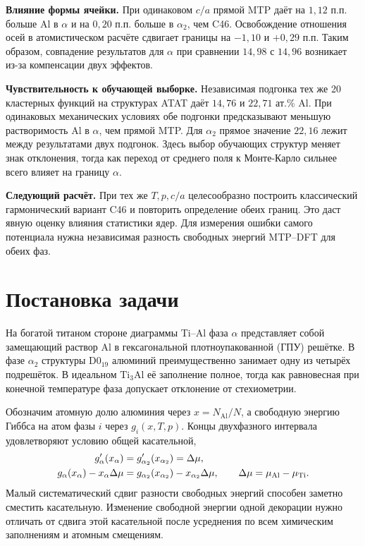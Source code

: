 \documentclass[11pt,a4paper]{article}
\begin{document}
\noindent\textbf{Влияние формы ячейки.}
При одинаковом \(c/a\) прямой MTP даёт на \(1{,}12\) п.п. больше Al
в \(\alpha\) и на \(0{,}20\) п.п. больше в \(\alpha_2\), чем C46.
Освобождение отношения осей в атомистическом расчёте сдвигает границы
на \(-1{,}10\) и \(+0{,}29\) п.п. Таким образом, совпадение результатов
для \(\alpha\) при сравнении \(14{,}98\) с \(14{,}96\) возникает из-за
компенсации двух эффектов.

\noindent\textbf{Чувствительность к обучающей выборке.}
Независимая подгонка тех же 20 кластерных функций на структурах ATAT
даёт \(14{,}76\) и \(22{,}71\) ат.\% Al. При одинаковых механических
условиях обе подгонки предсказывают меньшую растворимость Al в \(\alpha\),
чем прямой MTP. Для \(\alpha_2\) прямое значение \(22{,}16\) лежит между
результатами двух подгонок. Здесь выбор обучающих структур меняет знак
отклонения, тогда как переход от среднего поля к Монте-Карло сильнее всего
влияет на границу \(\alpha\).

\noindent\textbf{Следующий расчёт.}
При тех же \(T,p,c/a\) целесообразно построить классический гармонический
вариант C46 и повторить определение обеих границ. Это даст явную оценку
влияния статистики ядер. Для измерения ошибки самого потенциала
нужна независимая разность свободных энергий MTP--DFT для обеих фаз.

\vfill
{}
\clearpage
\section{Постановка задачи}
На богатой титаном стороне диаграммы Ti--Al фаза \(\alpha\) представляет
собой замещающий раствор Al в гексагональной плотноупакованной (ГПУ)
решётке. В фазе \(\alpha_2\) структуры D0$_{19}$ алюминий преимущественно
занимает одну из четырёх подрешёток. В идеальном \(\mathrm{Ti_3Al}\)
её заполнение полное, тогда как равновесная при конечной температуре
фаза допускает отклонение от стехиометрии.

Обозначим атомную долю алюминия через \(x=N_{\mathrm{Al}}/N\), а
свободную энергию Гиббса на атом фазы \(i\) через \(g_i(x,T,p)\).
Концы двухфазного интервала удовлетворяют условию общей касательной,
\begin{align}
  g'_\alpha(x_\alpha)&=g'_{\alpha_2}(x_{\alpha_2})=\Delta\mu, \\
  g_\alpha(x_\alpha)-x_\alpha\Delta\mu
    &=g_{\alpha_2}(x_{\alpha_2})-x_{\alpha_2}\Delta\mu ,
  \qquad \Delta\mu=\mu_{\rm Al}-\mu_{\rm Ti}.
\end{align}
Малый систематический сдвиг разности свободных энергий способен заметно
сместить касательную. Изменение свободной энергии одной декорации
нужно отличать от сдвига этой касательной после усреднения по всем
химическим заполнениям и атомным смещениям.
\end{document}
